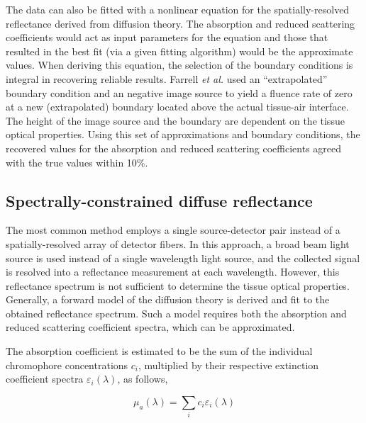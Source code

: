 The data can also be fitted with a nonlinear equation for the spatially-resolved reflectance derived from diffusion theory. The absorption and reduced scattering coefficients would act as input parameters for the equation and those that resulted in the best fit (via a given fitting algorithm) would be the approximate values. When deriving this equation, the selection of the boundary conditions is integral in recovering reliable results. Farrell \emph{et al.}\cite{Farrell1992} used an ``extrapolated'' boundary condition and an negative image source to yield a fluence rate of zero at a new (extrapolated) boundary located above the actual tissue-air interface. The height of the image source and the boundary are dependent on the tissue optical properties. Using this set of approximations and boundary conditions, the recovered values for the absorption and reduced scattering coefficients agreed with the true values within 10\%.


\subsection{Spectrally-constrained diffuse reflectance}
\label{spec_diff_refl}
The most common method employs a single source-detector pair instead of a spatially-resolved array of detector fibers. In this approach, a broad beam light source is used instead of a single wavelength light source, and the collected signal is resolved into a reflectance measurement at each wavelength. However, this reflectance spectrum is not sufficient to determine the tissue optical properties. Generally, a forward model of the diffusion theory is derived and fit to the obtained reflectance spectrum. Such a model requires both the absorption and reduced scattering coefficient spectra, which can be approximated.

The absorption coefficient is estimated to be the sum of the individual chromophore concentrations $c_i$, multiplied by their respective extinction coefficient spectra $\varepsilon_i(\lambda)$, as follows,

\begin{equation}
\mu_a(\lambda) = \sum_i c_i \varepsilon_i(\lambda)
\end{equation}

